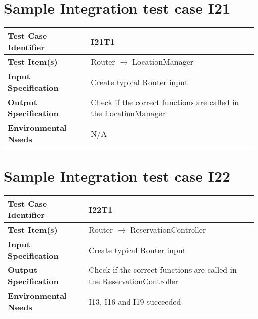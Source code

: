 \section{Sample Integration test case I21}\label{I21}
\begin{center}
	\vspace{0.6cm}
	\begin{tabular}{|l|l|}
		\hline
		\textbf{Test Case Identifier} & I21T1 \bigstrut \\\hline
		\textbf{Test Item(s)} & Router \ensuremath{\rightarrow} LocationManager \bigstrut \\\hline
		\textbf{Input Specification} & Create typical Router input \bigstrut \\\hline
		\textbf{Output Specification} & Check if the correct functions are called in the LocationManager \bigstrut \\\hline
		\textbf{Environmental Needs} & N/A \bigstrut \\\hline
	\end{tabular}
\end{center}

\section{Sample Integration test case I22}\label{I22}
\begin{center}
	\vspace{0.6cm}
	\begin{tabular}{|l|l|}
		\hline
		\textbf{Test Case Identifier} & I22T1 \bigstrut \\\hline
		\textbf{Test Item(s)} & Router \ensuremath{\rightarrow} ReservationController \bigstrut \\\hline
		\textbf{Input Specification} & Create typical Router input \bigstrut \\\hline
		\textbf{Output Specification} & Check if the correct functions are called in the ReservationController \bigstrut \\\hline
		\textbf{Environmental Needs} & I13, I16 and I19 succeeded \bigstrut \\\hline
	\end{tabular}
\end{center}

